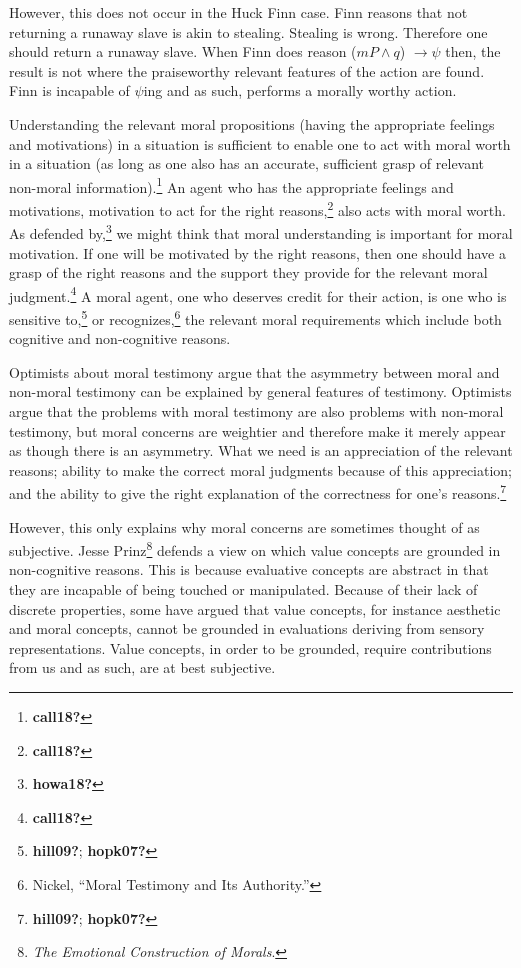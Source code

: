 \documentclass[
  12pt,
]{book}
\theoremstyle{definition}
\theoremstyle{definition}
\theoremstyle{definition}
\theoremstyle{definition}
\theoremstyle{remark}
\begin{document}
However, this does not occur in the Huck Finn case. Finn reasons that not returning a runaway slave is akin to stealing. Stealing is wrong. Therefore one should return a runaway slave. When Finn does reason (\(mP \land q\)) \(\rightarrow \psi\) then, the result is not where the praiseworthy relevant features of the action are found. Finn is incapable of \(\psi\)ing and as such, performs a morally worthy action.

Understanding the relevant moral propositions (having the appropriate feelings and motivations) in a situation is sufficient to enable one to act with moral worth in a situation (as long as one also has an accurate, sufficient grasp of relevant non-moral information).\footnote{\textbf{call18?}} An agent who has the appropriate feelings and motivations, motivation to act for the right reasons,\footnote{\textbf{call18?}} also acts with moral worth. As defended by,\footnote{\textbf{howa18?}} we might think that moral understanding is important for moral motivation. If one will be motivated by the right reasons, then one should have a grasp of the right reasons and the support they provide for the relevant moral judgment.\footnote{\textbf{call18?}} A moral agent, one who deserves credit for their action, is one who is sensitive to,\footnote{\textbf{hill09?}; \textbf{hopk07?}} or recognizes,\footnote{Nickel, {``Moral {Testimony} and Its {Authority}.''}} the relevant moral requirements which include both cognitive and non-cognitive reasons.

Optimists about moral testimony argue that the asymmetry between moral and non-moral testimony can be explained by general features of testimony. Optimists argue that the problems with moral testimony are also problems with non-moral testimony, but moral concerns are weightier and therefore make it merely appear as though there is an asymmetry. What we need is an appreciation of the relevant reasons; ability to make the correct moral judgments because of this appreciation; and the ability to give the right explanation of the correctness for one's reasons.\footnote{\textbf{hill09?}; \textbf{hopk07?}}

However, this only explains why moral concerns are sometimes thought of as subjective. Jesse Prinz\footnote{\emph{The {Emotional Construction} of {Morals}}.} defends a view on which value concepts are grounded in non-cognitive reasons. This is because evaluative concepts are abstract in that they are incapable of being touched or manipulated. Because of their lack of discrete properties, some have argued that value concepts, for instance aesthetic and moral concepts, cannot be grounded in evaluations deriving from sensory representations. Value concepts, in order to be grounded, require contributions from us and as such, are at best subjective.
\end{document}
